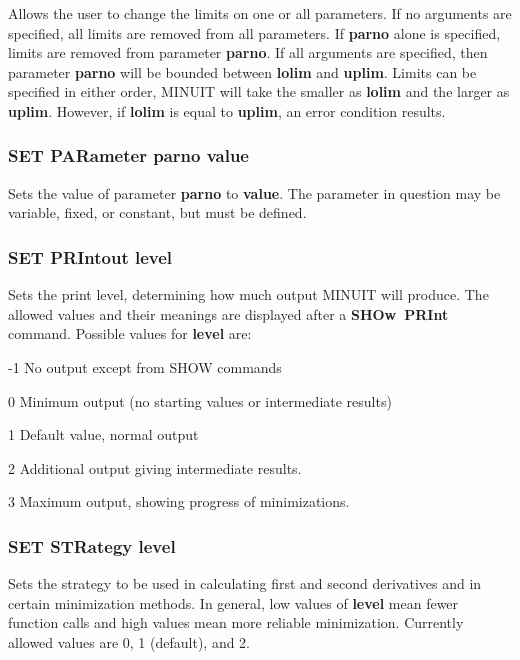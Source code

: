 Allows the user to change the limits on one or all parameters.
If no arguments are specified, all limits are removed from all parameters.
If {\bf \lsb parno\rsb } alone is specified,
limits are removed from parameter {\bf \lsb parno\rsb }.
If all arguments are specified, then parameter
{\bf \lsb parno\rsb } will be bounded
between {\bf \lsb lolim\rsb } and {\bf \lsb uplim\rsb }.
Limits can be specified in either order,
MINUIT will take the smaller as {\bf \lsb lolim\rsb }
and the larger as {\bf \lsb uplim\rsb }.
However, if {\bf \lsb lolim\rsb } is equal to
{\bf \lsb uplim\rsb }, an error condition results.

\subsubsection*{SET PARameter  parno  value}

Sets the value of parameter {\bf parno} to {\bf value}.
The parameter
in question may be variable, fixed, or constant, but must be defined.

\subsubsection*{SET PRIntout level}

Sets the print level, determining how much output
MINUIT will produce.
The allowed values and their meanings are displayed
after a {\bf SHOw~PRInt} command.
Possible values for {\bf level} are:
\begin{DLtt}{12}
\item[-1] No output except from SHOW commands
\item[0]  Minimum output (no starting values or intermediate results)
\item[1]  Default value, normal output
\item[2]  Additional output giving intermediate results.
\item[3]  Maximum output, showing progress of minimizations.
\end{DLtt}

\subsubsection*{SET STRategy level}

Sets the strategy to be used in calculating first and second derivatives
and in certain minimization methods. In general, low values of {\bf level}
mean fewer function calls and high values mean more reliable minimization.
Currently allowed values are 0, 1 (default), and 2.

